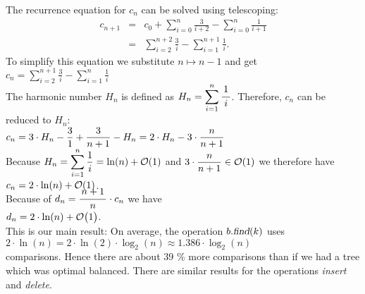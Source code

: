 The recurrence equation for $c_n$ can be solved using  telescoping:
\begin{eqnarray*}  
  c_{n+1} & = & c_0 + \sum\limits_{i=0}^{n} \frac{3}{i+2} - \sum\limits_{i=0}^{n} \frac{1}{i+1} 
\\[0.2cm]
          & = & \sum\limits_{i=2}^{n+2} \frac{3}{i} - \sum\limits_{i=1}^{n+1} \frac{1}{i}.
\end{eqnarray*}
To simplify this equation we substitute $n \mapsto n-1$ and get
\\[0.2cm]
\hspace*{1.3cm}
$c_{n} =  \displaystyle\sum\limits_{i=2}^{n+1} \frac{3}{i} - \sum\limits_{i=1}^{n} \frac{1}{i}$
\\[0.2cm]
The harmonic number  $H_n$ is defined as 
$H_n = \ds\sum\limits_{i=1}^{n} \bruch{1}{i}$.   
Therefore,  $c_n$ can be reduced to $H_n$: 
\\[0.2cm]
\hspace*{1.3cm}
$c_n = \displaystyle 3 \cdot H_n - \frac{3}{1} + \frac{3}{n+1} - H_n  =  \displaystyle 2 \cdot H_n - 3 \cdot \frac{n}{n+1}$
\\[0.2cm] 
Because $H_n = \displaystyle\sum\limits_{i=1}^{n} \frac{1}{i} = \ln(n) + \mathcal{O}(1)$ and $\displaystyle 3 \cdot\frac{n}{n+1} \in \mathcal{O}(1)$
we therefore have
  \\[0.3cm]
\hspace*{1.3cm} 
$\displaystyle c_n = 2 \cdot \ln(n) + \mathcal{O}(1)$.
\\[0.3cm]
Because of  $d_n = \bruch{n+1}{n}\cdot c_n$ we have \\[0.2cm]
\hspace*{1.3cm}
 $\displaystyle d_n = 2 \cdot \ln(n) + \mathcal{O}\bigl(1\bigr)$.
\\[0.2cm]
This is our main result:  On average, the operation $b.\textsl{find}(k)$ uses
\\[0.2cm]
\hspace*{1.3cm}
$2 \cdot \ln(n) = 2 \cdot \ln(2) \cdot \log_2(n) \approx 1.386 \cdot \log_2(n)$ 
\\[0.2cm]
comparisons.  Hence there are about  39 \% 
more comparisons than if we had a tree which was  optimal balanced.
There are similar results for the operations \textsl{insert} and \textsl{delete}.


